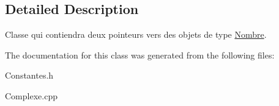 \subsection{Detailed Description}
Classe qui contiendra deux pointeurs vers des objets de type \hyperlink{class_calcul_1_1_nombre}{Nombre}. 

The documentation for this class was generated from the following files\-:\begin{DoxyCompactItemize}
\item 
Constantes.\-h\item 
Complexe.\-cpp\end{DoxyCompactItemize}
